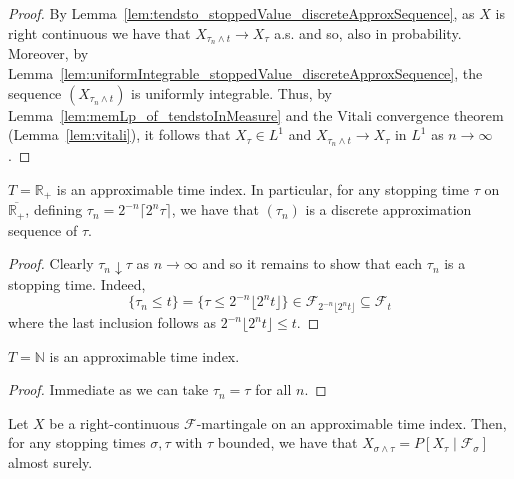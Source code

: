 \begin{proof}
  \leanok
  By Lemma~\ref{lem:tendsto_stoppedValue_discreteApproxSequence}, as \(X\) is right continuous we have that \(X_{\tau_n \wedge t} \to X_{\tau}\) a.s. and so,
  also in probability. Moreover, by Lemma~\ref{lem:uniformIntegrable_stoppedValue_discreteApproxSequence}, the sequence \((X_{\tau_n \wedge t})\) is uniformly integrable.
  Thus, by Lemma~\ref{lem:memLp_of_tendstoInMeasure} and the Vitali convergence theorem (Lemma~\ref{lem:vitali}), it
  follows that \(X_{\tau} \in L^1\) and \(X_{\tau_n \wedge t} \to X_{\tau}\) in \(L^1\) as \(n \to \infty\).
\end{proof}

\begin{lemma}\label{lem:stoppingTime_approximation}
  $T = \mathbb{R}_+$ is an approximable time index. In particular,
  for any stopping time $\tau$ on $\overline{\mathbb{R}_+}$, defining $\tau_n =  2^{-n} \lceil 2^n \tau \rceil$,
  we have that $(\tau_n)$ is a discrete approximation sequence of $\tau$.
\end{lemma}

\begin{proof}  Clearly $\tau_n \downarrow \tau$ as $n \to \infty$ and so it remains to show that each $\tau_n$ is a stopping time.
  Indeed,
  \[\{\tau_n \le t\} = \{\tau \le 2^{-n} \lfloor 2^n t\rfloor\}
    \in \mathcal{F}_{2^{-n} \lfloor 2^n t\rfloor} \subseteq \mathcal{F}_t\]
  where the last inclusion follows as \(2^{-n} \lfloor 2^n t\rfloor \le t\).
\end{proof}

\begin{lemma}\label{lem:stoppingTime_approximationNat}
  $T = \mathbb{N}$ is an approximable time index.
\end{lemma}

\begin{proof}  Immediate as we can take \(\tau_n = \tau\) for all \(n\).
\end{proof}

\begin{lemma}\label{lem:optionalSampling}
  \leanok
  Let $X$ be a right-continuous $\mathcal{F}$-martingale on an approximable time index. Then, for
  any stopping times $\sigma, \tau$ with $\tau$ bounded, we have that
  $X_{\sigma \wedge \tau} = P[X_{\tau} \mid \mathcal{F}_{\sigma}]$ almost surely.
\end{lemma}

